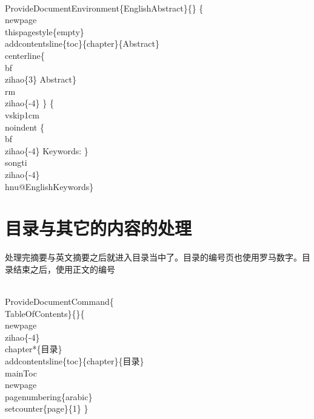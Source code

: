 \documentclass{hnuthesis}%
\begin{document}
\begin{nowebtrunk}
\\ProvideDocumentEnvironment\{EnglishAbstract\}\{\}%
\{\\newpage\\thispagestyle\{empty\}%
\\addcontentsline\{toc\}\{chapter\}\{Abstract\}
\\centerline\{\\bf\\zihao\{3\} Abstract\}
\\rm\\zihao\{-4\}
\}%
\{\\vskip1cm
    \\noindent \{\\bf\\zihao\{-4\} Keywords: \}\\songti\\zihao\{-4\} \\hnu@EnglishKeywords\}
\nwendcode{}\end{nowebtrunk}



\section{目录与其它的内容的处理}

处理完摘要与英文摘要之后就进入目录当中了。目录的编号页也使用罗马数字。目录结束之后，使用正文的编号

\begin{nowebtrunk}
\nwenddocs{}\plusendmoddef\nwstartdeflinemarkup{}\nwenddeflinemarkup
\\ProvideDocumentCommand\{\\TableOfContents\}\{\}\{
    \\newpage \\zihao\{-4\}\\chapter*\{目录\}
    \\addcontentsline\{toc\}\{chapter\}\{目录\}
\\mainToc\\newpage
\\pagenumbering\{arabic\}\\setcounter\{page\}\{1\}
\}
\nwendcode{}\end{nowebtrunk}
\end{document}

